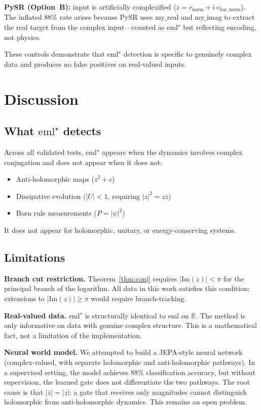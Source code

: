 \documentclass[12pt,a4paper]{article}
\newcommand{\emlstar}{\mathrm{eml}^{\star}}
\newcommand{\eml}{\mathrm{eml}}
\newcommand{\conj}[1]{\overline{#1}}
\begin{document}
\textbf{PySR (Option~B):} input is artificially complexified
($z = r_{\mathrm{norm}} + i\,v_{\mathrm{bar,norm}}$).
The inflated 88\% rate arises because PySR uses
$\mathrm{my\_real}$ and $\mathrm{my\_imag}$ to extract the
real target from the complex input---counted as $\emlstar$
but reflecting encoding, not physics.

These controls demonstrate that $\emlstar$ detection is specific
to genuinely complex data and produces no false positives on
real-valued inputs.


\section{Discussion}
\label{sec:discussion}

\subsection{What $\emlstar$ detects}

Across all validated tests, $\emlstar$ appears when
the dynamics involves complex conjugation and does not appear
when it does not:
\begin{itemize}
\item Anti-holomorphic maps ($\conj{z}^2 + c$)
\item Dissipative evolution ($|U| < 1$, requiring $|z|^2 = z\conj{z}$)
\item Born rule measurements ($P = |\psi|^2$)
\end{itemize}
It does not appear for holomorphic, unitary, or energy-conserving systems.

\subsection{Limitations}

\textbf{Branch cut restriction.}
Theorem~\ref{thm:conj} requires $|\mathrm{Im}(z)| < \pi$ for
the principal branch of the logarithm. All data in this work
satisfies this condition; extensions to $|\mathrm{Im}(z)| \geq \pi$
would require branch-tracking.

\textbf{Real-valued data.}
$\emlstar$ is structurally identical to $\eml$ on $\mathbb{R}$.
The method is only informative on data with genuine complex structure.
This is a mathematical fact, not a limitation of the implementation.

\textbf{Neural world model.}
We attempted to build a JEPA-style neural network (complex-valued,
with separate holomorphic and anti-holomorphic pathways).
In a supervised setting, the model achieves 88\% classification
accuracy, but without supervision, the learned gate does not
differentiate the two pathways.
The root cause is that $|\conj{z}| = |z|$: a gate that receives
only magnitudes cannot distinguish holomorphic from anti-holomorphic
dynamics. This remains an open problem.
\end{document}
